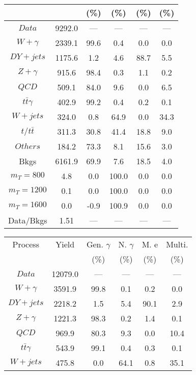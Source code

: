 \begin{figure}
\begin{minipage}[c]{0.32\textwidth}
{\begin{tabular}{cccccc}
 &  & (\%) & (\%) & (\%) & (\%)  \\
\hline
                                                                      $ Data $ &  9292.0 &  --- &  --- &  --- &  ---\\
$ W+\gamma $ &  2339.1 &  99.6 &  0.4 &  0.0 &  0.0\\
$ DY+jets $ &  1175.6 &  1.2 &  4.6 &  88.7 &  5.5\\
$ Z+\gamma $ &  915.6 &  98.4 &  0.3 &  1.1 &  0.2\\
$ QCD $ &  509.1 &  84.0 &  9.6 &  0.0 &  6.5\\
$ t\bar{t}\gamma $ &  402.9 &  99.2 &  0.4 &  0.2 &  0.1\\
$ W+jets $ &  324.0 &  0.8 &  64.9 &  0.0 &  34.3\\
$ t/t\bar{t} $ &  311.3 &  30.8 &  41.4 &  18.8 &  9.0\\
$ Others $ &  184.2 &  73.3 &  8.1 &  15.6 &  3.0\\
Bkgs &  6161.9 &  69.9 &  7.6 &  18.5 &  4.0\\
$ m_{T} = 800 $ &  4.8 &  0.0 &  100.0 &  0.0 &  0.0\\
$ m_{T} = 1200 $ &  0.1 &  0.0 &  100.0 &  0.0 &  0.0\\
$ m_{T} = 1600 $ &  0.0 &  -0.9 &  100.9 &  0.0 &  0.0\\
Data/Bkgs &  1.51 &  --- &  --- &  --- &  ---\\
\hline
\end{tabular}
}
\end{minipage}
\begin{minipage}[c]{0.32\textwidth}
\centering
\tiny{
\begin{tabular}{cccccc}
\hline
Process & Yield & Gen. $\gamma$ & N. $\gamma$ & M. e & Multi. \\
 &  & (\%) & (\%) & (\%) & (\%)  \\
\hline
                                                                      $ Data $ &  12079.0 &  --- &  --- &  --- &  ---\\
$ W+\gamma $ &  3591.9 &  99.8 &  0.1 &  0.2 &  0.0\\
$ DY+jets $ &  2218.2 &  1.5 &  5.4 &  90.1 &  2.9\\
$ Z+\gamma $ &  1221.3 &  98.3 &  0.2 &  1.4 &  0.1\\
$ QCD $ &  969.9 &  80.3 &  9.3 &  0.0 &  10.4\\
$ t\bar{t}\gamma $ &  543.9 &  99.1 &  0.4 &  0.3 &  0.1\\
$ W+jets $ &  475.8 &  0.0 &  64.1 &  0.8 &  35.1\\

\end{tabular}}
\end{minipage}
\end{figure}
